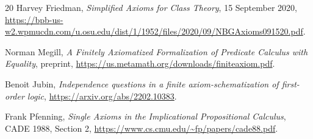 \documentclass[11pt,letterpaper]{article}
\theoremstyle{definition}\newtheorem{definition}[theorem]{Definition}
\begin{document}
\begin{thebibliography}{20}
 Harvey Friedman, \emph{Simplified Axioms for Class Theory},
15 September 2020, \url{https://bpb-us-w2.wpmucdn.com/u.osu.edu/dist/1/1952/files/2020/09/NBGAxioms091520.pdf}.

 Norman Megill, \emph{A Finitely Axiomatized Formalization
of Predicate Calculus with Equality}, preprint,
\url{https://us.metamath.org/downloads/finiteaxiom.pdf}.

 Benoit Jubin, \emph{Independence questions in a finite
axiom-schematization of first-order logic}, \url{https://arxiv.org/abs/2202.10383}.

 Frank Pfenning, \emph{Single Axioms in the Implicational
Propositional Calculus}, CADE 1988, Section 2,
\url{https://www.cs.cmu.edu/~fp/papers/cade88.pdf}.
\end{thebibliography}
\end{document}
